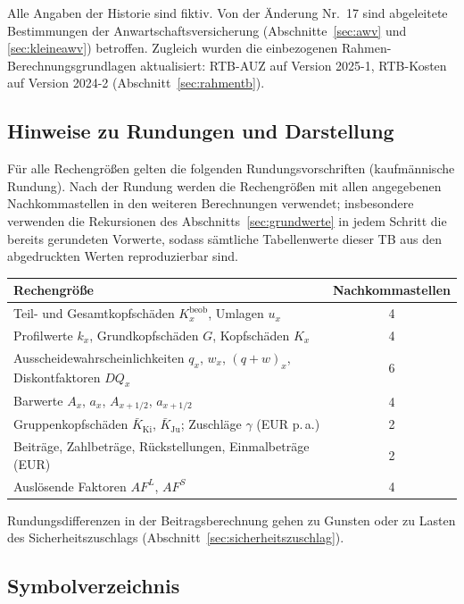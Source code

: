 Alle Angaben der Historie sind fiktiv. Von der Änderung Nr.~17 sind
abgeleitete Bestimmungen der Anwartschaftsversicherung
(Abschnitte~\ref{sec:awv} und \ref{sec:kleineawv}) betroffen. Zugleich
wurden die einbezogenen Rahmen-Berechnungsgrundlagen aktualisiert:
\mbox{RTB-AUZ} auf Version 2025-1, \mbox{RTB-Kosten} auf Version 2024-2
(Abschnitt~\ref{sec:rahmentb}).

\subsection{Hinweise zu Rundungen und Darstellung}\label{sec:rundung}

Für alle Rechengrößen gelten die folgenden Rundungsvorschriften
(kaufmännische Rundung). Nach der Rundung werden die Rechengrößen mit
allen angegebenen Nachkommastellen in den weiteren Berechnungen
verwendet; insbesondere verwenden die Rekursionen des
Abschnitts~\ref{sec:grundwerte} in jedem Schritt die bereits gerundeten
Vorwerte, sodass sämtliche Tabellenwerte dieser TB aus den abgedruckten
Werten reproduzierbar sind.

\begin{center}\small
\begin{tabular}{@{}lc@{}}
\toprule
Rechengröße & Nachkommastellen \\
\midrule
Teil- und Gesamtkopfschäden $K^{\mathrm{beob}}_x$, Umlagen $u_x$ & 4 \\
Profilwerte $k_x$, Grundkopfschäden $G$, Kopfschäden $K_x$ & 4 \\
Ausscheidewahrscheinlichkeiten $q_x$, $w_x$, $(q+w)_x$, Diskontfaktoren $DQ_x$ & 6 \\
Barwerte $A_x$, $a_x$, $A_{x+1/2}$, $a_{x+1/2}$ & 4 \\
Gruppenkopfschäden $\bar{K}_{\mathrm{Ki}}$, $\bar{K}_{\mathrm{Ju}}$; Zuschläge $\gamma$ (EUR p.\,a.) & 2 \\
Beiträge, Zahlbeträge, Rückstellungen, Einmalbeträge (EUR) & 2 \\
Auslösende Faktoren $AF^{L}$, $AF^{S}$ & 4 \\
\bottomrule
\end{tabular}
\end{center}

Rundungsdifferenzen in der Beitragsberechnung gehen zu Gunsten oder zu
Lasten des Sicherheitszuschlags (Abschnitt~\ref{sec:sicherheitszuschlag}).

\subsection{Symbolverzeichnis}\label{sec:symbole}


